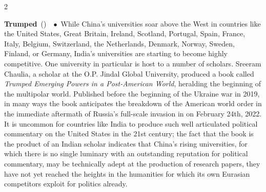 \documentclass[10pt,a4paper,twoside]{article} %
\newcommand{\entry}[4]{\markboth{#1}{#1}\textbf{#1}\ {(#2)}\ \textit{#3}\ $\bullet$\ {#4}}  %
\begin{document}
\begin{multicols}{2}
\entry{Trumped} {} {} {While China's universities soar above the West in countries like the United States, Great Britain, Ireland, Scotland, Portugal, Spain, France, Italy, Belgium, Switzerland, the Netherlands, Denmark, Norway, Sweden, Finland, or Germany, India's universities are starting to become highly competitive. One university in particular is host to a number of scholars. \newline \indent Sreeram Chaulia, a scholar at the O.P. Jindal Global University, produced a book called \emph{Trumped Emerging Powers in a Post-American World}, heralding the beginning of the multipolar world. Published before the beginning of the Ukraine war in 2019, in many ways the book anticipates the breakdown of the American world order in the immediate aftermath of Russia's full-scale invasion in on February 24th, 2022. \newline \indent It is uncommon for countries like India to produce such well articulated political commentary on the United States in the 21st century; the fact that the book is the product of an Indian scholar indicates that China's rising universities, for which there is no single luminary with an outstanding reputation for political commentary, may be technically adept at the production of research papers, they have not yet reached the heights in the humanities for which its own Eurasian competitors exploit for politics already. 
}





\end{multicols}
\end{document}
